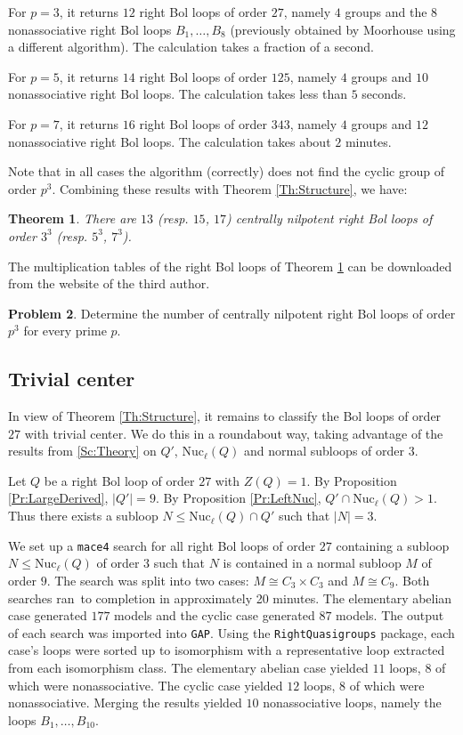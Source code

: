 \documentclass[12pt,reqno]{amsart}
\numberwithin{equation}{section}
\theoremstyle{plain}
\newtheorem{theorem}{Theorem}[section]
\theoremstyle{definition}
\newtheorem{problem}[theorem]{Problem}
\newcommand{\lnuc}[1]{\mathrm{Nuc}_\ell(#1)}
\newcommand{\Z}{C}
\begin{document}
For $p=3$, it returns $12$ right Bol loops of order $27$, namely $4$ groups and the $8$ nonassociative right Bol loops $B_1,\dots,B_8$ (previously obtained by Moorhouse \cite{Moorhouse} using a different algorithm). The calculation takes a fraction of a second.

For $p=5$, it returns $14$ right Bol loops of order $125$, namely $4$ groups and $10$ nonassociative right Bol loops. The calculation takes less than $5$ seconds.

For $p=7$, it returns $16$ right Bol loops of order $343$, namely $4$ groups and $12$ nonassociative right Bol loops. The calculation takes about $2$ minutes.

Note that in all cases the algorithm (correctly) does not find the cyclic group of order $p^3$. Combining these results with Theorem \ref{Th:Structure}, we have:

\begin{theorem}\label{Th:Nilp}
There are $13$ (resp. $15$, $17$) centrally nilpotent right Bol loops of order $3^3$ (resp. $5^3$, $7^3$).
\end{theorem}

The multiplication tables of the right Bol loops of Theorem \ref{Th:Nilp} can be downloaded from the website of the third author.

\begin{problem}
Determine the number of centrally nilpotent right Bol loops of order $p^3$ for every prime $p$.
\end{problem}

\subsection{Trivial center}\label{Ss:TrivialCenter}

In view of Theorem \ref{Th:Structure}, it remains to classify the Bol loops of order $27$ with trivial center. We do this in a roundabout way, taking advantage of the results from \cref{Sc:Theory} on $Q'$, $\lnuc{Q}$ and normal subloops of order $3$.

Let $Q$ be a right Bol loop of order $27$ with $Z(Q)=1$. By Proposition \ref{Pr:LargeDerived}, $|Q'|=9$. By Proposition \ref{Pr:LeftNuc}, $Q'\cap\lnuc{Q} > 1$. Thus there exists a subloop $N\leq\lnuc{Q}\cap Q'$ such that $|N|=3$.

We set up a \texttt{mace4} search for all right Bol loops of order $27$ containing a subloop $N\le\lnuc{Q}$ of order $3$ such that $N$ is contained in a normal subloop $M$ of order $9$. The search was split into two cases: $M\cong\Z_3\times\Z_3$ and $M\cong\Z_9$. Both searches ran to completion in approximately 20 minutes. The elementary abelian case generated $177$ models and the cyclic case generated $87$ models. The output of each search was imported into \texttt{GAP}. Using the \texttt{RightQuasigroups} package, each case's loops were sorted up to isomorphism with a representative loop extracted from each isomorphism class. The elementary abelian case yielded $11$ loops, $8$ of which were nonassociative. The cyclic case yielded $12$ loops, $8$ of which were nonassociative. Merging the results yielded $10$ nonassociative loops, namely the loops $B_1,\dots,B_{10}$.
\end{document}
